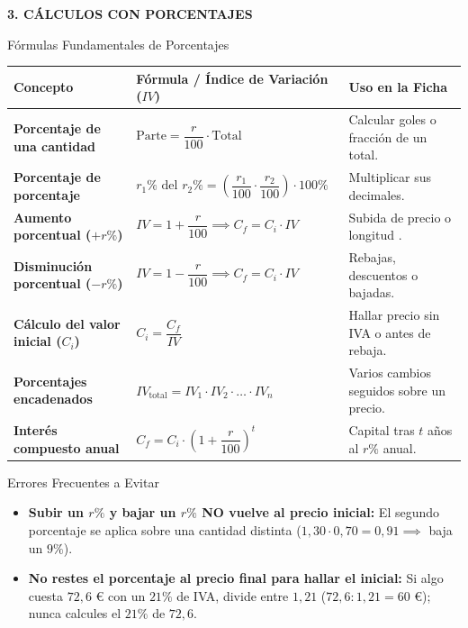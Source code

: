 \documentclass[a4paper,11pt]{article}
\begin{document}
\vspace{0.2cm}
\noindent\textbf{\large\color{primary} 3. CÁLCULOS CON PORCENTAJES}
\vspace{0.1cm}

\begin{formulabox}{Fórmulas Fundamentales de Porcentajes }
\renewcommand{\arraystretch}{1.45}
\begin{tabular}{@{}p{4.8cm} p{5.8cm} p{6.2cm}@{}}
\toprule
\textbf{Concepto} & \textbf{Fórmula / Índice de Variación ($IV$)} & \textbf{Uso en la Ficha} \\
\midrule
\textbf{Porcentaje de una cantidad} & $\text{Parte} = \dfrac{r}{100} \cdot \text{Total}$ & Calcular goles o fracción de un total. \\
\textbf{Porcentaje de porcentaje} & $r_1\% \text{ del } r_2\% = \left(\dfrac{r_1}{100} \cdot \dfrac{r_2}{100}\right) \cdot 100\%$ & Multiplicar sus decimales. \\
\textbf{Aumento porcentual ($+r\%$)} & $IV = 1 + \dfrac{r}{100} \implies C_f = C_i \cdot IV$ & Subida de precio o longitud 
. \\
\textbf{Disminución porcentual ($-r\%$)} & $IV = 1 - \dfrac{r}{100} \implies C_f = C_i \cdot IV$ & Rebajas, descuentos o bajadas. \\
\textbf{Cálculo del valor inicial ($C_i$)} & $C_i = \dfrac{C_f}{IV}$ & Hallar precio sin IVA o antes de rebaja. \\
\textbf{Porcentajes encadenados} & $IV_{\text{total}} = IV_1 \cdot IV_2 \cdot \ldots \cdot IV_n$ & Varios cambios seguidos sobre un precio. \\
\textbf{Interés compuesto anual} & $C_f = C_i \cdot \left(1 + \dfrac{r}{100}\right)^{t}$ & Capital tras $t$ años al $r\%$ anual. \\
\bottomrule
\end{tabular}
\end{formulabox}

\begin{alertbox}{Errores Frecuentes a Evitar}
\begin{itemize}[leftmargin=*, itemsep=1pt, topsep=0pt]
    \item \textbf{Subir un $r\%$ y bajar un $r\%$ NO vuelve al precio inicial:} El segundo porcentaje se aplica sobre una cantidad distinta ($1,30 \cdot 0,70 = 0,91 \implies$ baja un $9\%$).
    \item \textbf{No restes el porcentaje al precio final para hallar el inicial:} Si algo cuesta $72,6\text{ €}$ con un $21\%$ de IVA, divide entre $1,21$ ($72,6 : 1,21 = 60\text{ €}$); nunca calcules el $21\%$ de $72,6$.
\end{itemize}
\end{alertbox}
\end{document}
